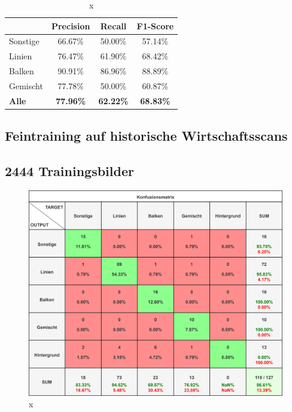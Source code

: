 \begin{table}[H]
    \centering
    \begin{tabular}{|l|c|c|c|}
        \hline
        \rowcolor[HTML]{EFEFEF}
                      & Precision        & Recall           & F1-Score         \\ \hline
        Sonstige      & 66.67\%          & 50.00\%          & 57.14\%          \\ \hline
        Linien        & 76.47\%          & 61.90\%          & 68.42\%          \\ \hline
        Balken        & 90.91\%          & 86.96\%          & 88.89\%          \\ \hline
        Gemischt      & 77.78\%          & 50.00\%          & 60.87\%          \\ \hline
        \textbf{Alle} & \textbf{77.96\%} & \textbf{62.22\%} & \textbf{68.83\%} \\ \hline
    \end{tabular}
    \caption{x}
\end{table}


\subsection{Feintraining auf historische Wirtschaftsscans}
\subsection*{2444 Trainingsbilder}
\begin{figure}[H]
    \centering
    \captionsetup{width=1\linewidth}
    \includegraphics[width=1\textwidth]{Experimente/img/detect/val@0.891 20240612-093743_double/konfusionsmatrix.png}
    \caption{ x}
    \label{fig:extraction_output}
\end{figure}

